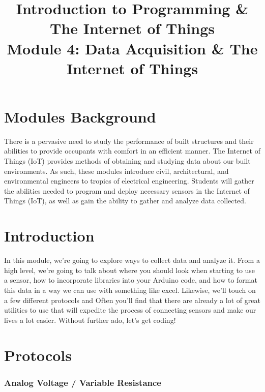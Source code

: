 \documentclass[a4paper]{article}
\title{ \textbf{Introduction to Programming \& The Internet of Things} \\
Module 4: Data Acquisition \& The Internet of Things \vspace{-5ex} \\
}
\date{}
\begin{document}
\maketitle
\thispagestyle{fancy}

\section{Modules Background}
There is a pervasive need to study the performance of built structures and their abilities to provide occupants with comfort in an efficient manner. The Internet of Things (IoT) provides methods of obtaining and studying data about our built environments. As such, these modules introduce civil, architectural, and environmental engineers to tropics of electrical engineering. Students will gather the abilities needed to program and deploy necessary sensors in the Internet of Things (IoT), as well as gain the ability to gather and analyze data collected.

\tableofcontents
\newpage

\section{Introduction}
\label{sec:introduction}

In this module, we're going to explore ways to collect data and analyze it. From a high level, we're going to talk about where you should look when starting to use a sensor, how to incorporate libraries into your Arduino code, and how to format this data in a way we can use with something like excel. Likewise, we'll touch on a few different protocols and Often you'll find that there are already a lot of great utilities to use that will expedite the process of connecting sensors and make our lives a lot easier. Without further ado, let's get coding!

\section{Protocols}
\subsubsection{Analog Voltage / Variable Resistance}
\end{document}
